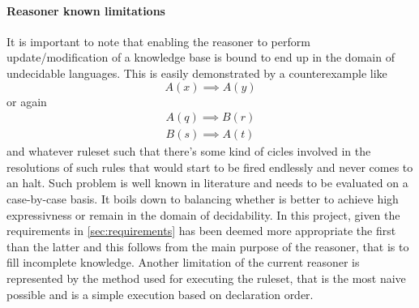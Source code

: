 \paragraph{Reasoner known limitations}
It is important to note that enabling the reasoner to perform update/modification of a knowledge base is bound to end up in the domain of undecidable languages. This is easily demonstrated by a counterexample like
\begin{equation}
  A(x)\implies A(y)
\end{equation}
or again
\begin{equation}
  \begin{gathered}
    A(q)\implies B(r) \\
    B(s)\implies A(t)
  \end{gathered}
\end{equation}
and whatever ruleset such that there's some kind of cicles involved in the resolutions of such rules that would start to be fired endlessly and never comes to an halt. Such problem is well known in literature and needs to be evaluated on a case-by-case basis. It boils down to balancing whether is better to achieve high expressivness or remain in the domain of decidability. In this project, given the requirements in \autoref{sec:requirements} has been deemed more appropriate the first than the latter and this follows from the main purpose of the reasoner, that is to fill incomplete knowledge. Another limitation of the current reasoner is represented by the method used for executing the ruleset, that is the most naive possible and is a simple execution based on declaration order.

